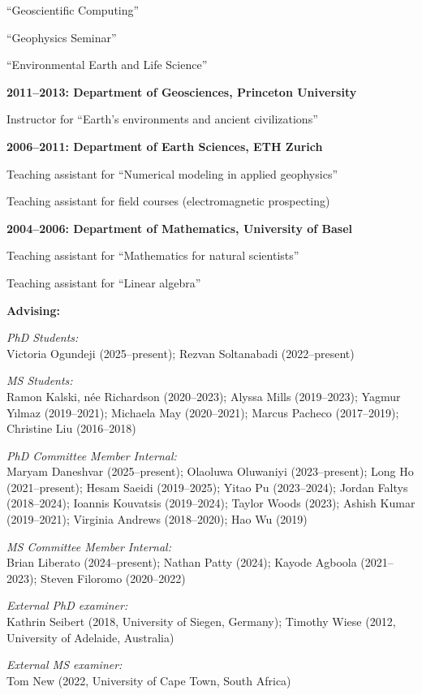 \documentclass[10pt]{article}
\begin{document}
``Geoscientific Computing''

``Geophysics Seminar''

``Environmental Earth and Life Science''


\spcp
\textbf{2011--2013:  Department of Geosciences, Princeton University}

Instructor for ``Earth's environments and ancient civilizations''

\spcp
\textbf{2006--2011: Department of Earth Sciences, ETH Zurich}

Teaching assistant for ``Numerical modeling in applied geophysics''
     
Teaching assistant for field courses (electromagnetic prospecting)

\spcp
\textbf{2004--2006: Department of Mathematics, University of Basel}

Teaching assistant for ``Mathematics for natural scientists''

Teaching assistant for ``Linear algebra''


\spc
\textbf{\tsize Advising:}

\spcp
\emph{PhD Students:}\\
Victoria Ogundeji (2025--present);
Rezvan Soltanabadi (2022--present)

\spcp
\emph{MS Students:}\\
Ramon Kalski, n{\'e}e Richardson (2020--2023); 
Alyssa Mills (2019--2023);
Yagmur Y\i lmaz (2019--2021);
Michaela May (2020--2021);
Marcus Pacheco (2017--2019);
Christine Liu (2016--2018) 

\spcp
\emph{PhD Committee Member Internal:}\\
Maryam Daneshvar (2025--present);
Olaoluwa Oluwaniyi (2023--present);
Long Ho (2021--present);
Hesam Saeidi (2019--2025);
Yitao Pu (2023--2024);
Jordan Faltys (2018--2024);
Ioannis Kouvatsis (2019--2024);
Taylor Woods (2023);
Ashish Kumar (2019--2021);
Virginia Andrews (2018--2020);
Hao Wu (2019)


\spcp
\emph{MS Committee Member Internal:}\\
Brian Liberato (2024--present);
Nathan Patty (2024);
Kayode Agboola (2021--2023);
Steven Filoromo (2020--2022) 

\spcp
\emph{External PhD examiner:}\\
Kathrin Seibert (2018, University of Siegen, Germany);
Timothy Wiese (2012, University of Adelaide, Australia)

\spcp
\emph{External MS examiner:}\\
Tom New (2022, University of Cape Town, South Africa)
\end{document}
